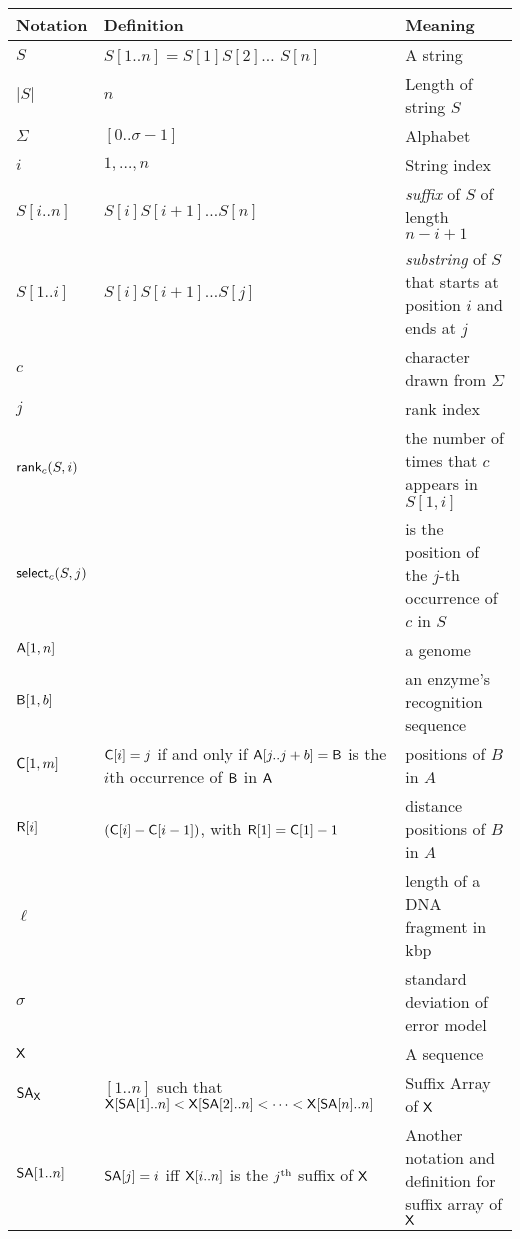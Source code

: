 \documentclass{article}
\begin{document}
\begin{table}
  \begin{tabularx}{\textwidth}{|l|X|X|}
    \hline
    Notation & Definition  & Meaning \\ \hline
    \hline
    \hline
    
    $S $ & $S[1..n] = S[1]S[2]\ldots$ $S[n]$ & A string \\ \hline
    $|S| $ & $ n$ & Length of string $S$ \\ \hline
    $\Sigma$ & $[0..\sigma-1]$ & Alphabet \\ \hline
    $i$ & $1,\ldots,n$ & String index \\ \hline
    $S[i..n]$ & $ S[i]S[i+1]\ldots S[n]$&  \emph{suffix} of $S$ of length $n-i+1$ \\ \hline
    $S[1..i]$ &  $S[i]S[i+1]\ldots S[j]$ & \emph{substring} of $S$ that starts at position $i$ and ends at $j$ \\ \hline
    $c$ & & character drawn from $\Sigma$ \\ \hline
    $j$ & & rank index \\ \hline
    $\textsf{rank}_c(S,i)$  & & the number of times that $c$ appears in $S[1,i]$ \\ \hline
    $\textsf{select}_c(S,j)$ & & is the position of the $j$-th occurrence of $c$ in $S$ \\ \hline
    $\mathsf{A}[1,n]$ & & a genome \\ \hline
    $\mathsf{B}[1,b]$ & & an enzyme's recognition sequence \\ \hline
    $\mbox{\rm {\sf C}}[1,m]$ & $\mbox{\rm {\sf C}}[i] = j$ if and only if $\mathsf{A}[j..j+b] = \mathsf{B}$ is the $i$th occurrence of $\mathsf{B}$ in $\mathsf{A}$ & positions of $B$ in $A$ \\ \hline
    $\mbox{\rm {\sf R}}[i]$ & $ (\mbox{\rm {\sf C}}[i]-\mbox{\rm {\sf C}}[i-1])$, with $\mbox{\rm {\sf R}}[1] = \mbox{\rm {\sf C}}[1]-1$ & distance positions of $B$ in $A$ \\ \hline
    $\ell$ & & length of a DNA fragment in kbp \\ \hline
    $\sigma$ & & standard deviation of error model \\ \hline %
    $\mathsf{X}$ & & A sequence \\ \hline %
    $\mbox{\rm {\sf SA}}_{\mathsf{X}}$  &  $[1..n]$ such that $\mathsf{X}[\mbox{\rm {\sf SA}}[1]..n] < \mathsf{X}[\mbox{\rm {\sf SA}}[2]..n] < \cdots < \mathsf{X}[\mbox{\rm {\sf SA}}[n]..n]$ & Suffix Array of $\mathsf{X}$ \\ \hline
    $\mbox{\rm {\sf SA}}[1..n]$ & $\mbox{\rm {\sf SA}}[j] = i$ iff $\mathsf{X}[i..n]$ is the $j^{\mbox{{\scriptsize th}}}$ suffix of $\mathsf{X}$ & Another notation and definition for suffix array of $\mathsf{X}$ \\ \hline

\end{tabularx}
\end{table}
\end{document}
